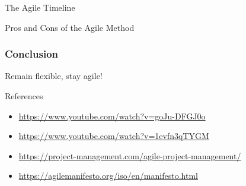 \documentclass[10pt]{beamer}
\begin{document}
\begin{frame}{The Agile Timeline}
\end{frame}

\begin{frame}{Pros and Cons of the Agile Method}
\end{frame}

\begin{frame}[plain]
  \frametitle{Conclusion}
  \begin{center}
      \Huge Remain flexible, stay agile!
  \end{center}
\end{frame}

\begin{frame}{References}
  \begin{itemize}
    \item \href{https://www.youtube.com/watch?v=goJu-DFGJ0o}{https://www.youtube.com/watch?v=goJu-DFGJ0o}
    \item \href{https://www.youtube.com/watch?v=1evfn3qTYGM}{https://www.youtube.com/watch?v=1evfn3qTYGM}
    \item \href{https://project-management.com/agile-project-management/}{https://project-management.com/agile-project-management/}
    \item \href{https://agilemanifesto.org/iso/en/manifesto.html}{https://agilemanifesto.org/iso/en/manifesto.html}
  \end{itemize}


\end{frame}
\begin{frame}
  \cite{aref}
  
  
\end{frame}
\end{document}
